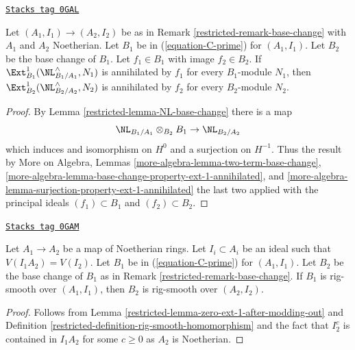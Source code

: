\begin{lemma}
\label{restricted-lemma-zero-ext-1-after-modding-out}
\href{https://stacks.math.columbia.edu/tag/0GAL}{\texttt{Stacks tag 0GAL}}

Let $(A_1, I_1) \to (A_2, I_2)$ be as in
Remark \ref{restricted-remark-base-change} with $A_1$ and $A_2$ Noetherian.
Let $B_1$ be in (\ref{equation-C-prime}) for $(A_1, I_1)$.
Let $B_2$ be the base change of $B_1$. Let $f_1 \in B_1$
with image $f_2 \in B_2$.
If $\Ext^1_{B_1}(\NL_{B_1/A_1}^\wedge, N_1)$ is annihilated
by $f_1$ for every $B_1$-module $N_1$, then
$\Ext^1_{B_2}(\NL_{B_2/A_2}^\wedge, N_2)$ is annihilated
by $f_2$ for every $B_2$-module $N_2$.
\end{lemma}

\begin{proof}

By Lemma \ref{restricted-lemma-NL-base-change} there is a map
$$
\NL_{B_1/A_1} \otimes_{B_2} B_1 \to \NL_{B_2/A_2}
$$
which induces and isomorphism on $H^0$ and a surjection on $H^{-1}$.
Thus the result by More on Algebra, Lemmas
\ref{more-algebra-lemma-two-term-base-change},
\ref{more-algebra-lemma-base-change-property-ext-1-annihilated}, and
\ref{more-algebra-lemma-surjection-property-ext-1-annihilated}
the last two applied with the principal ideals $(f_1) \subset B_1$ and
$(f_2) \subset B_2$.
\end{proof}

\begin{lemma}
\label{restricted-lemma-base-change-rig-smooth-homomorphism}
\href{https://stacks.math.columbia.edu/tag/0GAM}{\texttt{Stacks tag 0GAM}}

Let $A_1 \to A_2$ be a map of Noetherian rings. Let $I_i \subset A_i$
be an ideal such that $V(I_1A_2) = V(I_2)$. Let $B_1$ be in
(\ref{equation-C-prime}) for $(A_1, I_1)$.
Let $B_2$ be the base change of $B_1$ as in
Remark \ref{restricted-remark-base-change}.
If $B_1$ is rig-smooth over $(A_1, I_1)$,
then $B_2$ is rig-smooth over $(A_2, I_2)$.
\end{lemma}

\begin{proof}

Follows from Lemma \ref{restricted-lemma-zero-ext-1-after-modding-out} and
Definition \ref{restricted-definition-rig-smooth-homomorphism}
and the fact that $I_2^c$ is contained in $I_1A_2$ for some $c \geq 0$
as $A_2$ is Noetherian.
\end{proof}

